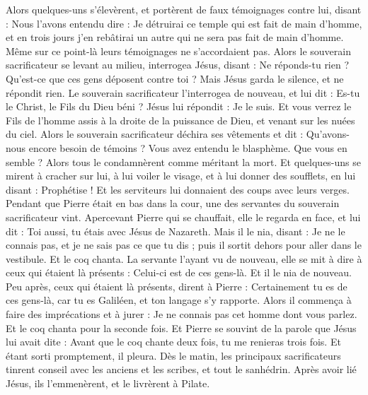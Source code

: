 \begin{multicols}{2}
Alors quelques-uns s'élevèrent, et portèrent de faux témoignages contre lui, disant :
Nous l’avons entendu dire : Je détruirai ce temple qui est fait de main d’homme, et en trois jours j'en rebâtirai un autre qui ne sera pas fait de main d’homme.
Même sur ce point-là leurs témoignages ne s’accordaient pas.
Alors le souverain sacrificateur se levant au milieu, interrogea Jésus, disant : Ne réponds-tu rien ? Qu’est-ce que ces gens déposent contre toi ?
Mais Jésus garda le silence, et ne répondit rien. Le souverain sacrificateur l'interrogea de nouveau, et lui dit : Es-tu le Christ, le Fils du Dieu béni ?
Jésus lui répondit : Je le suis. Et vous verrez le Fils de l'homme assis à la droite de la puissance de Dieu, et venant sur les nuées du ciel.
Alors le souverain sacrificateur déchira ses vêtements et dit : Qu'avons-nous encore besoin de témoins ?
Vous avez entendu le blasphème. Que vous en semble ? Alors tous le condamnèrent comme méritant la mort.
Et quelques-uns se mirent à cracher sur lui, à lui voiler le visage, et à lui donner des soufflets, en lui disant : Prophétise ! Et les serviteurs lui donnaient des coups avec leurs verges.
Pendant que Pierre était en bas dans la cour, une des servantes du souverain sacrificateur vint.
Apercevant Pierre qui se chauffait, elle le regarda en face, et lui dit : Toi aussi, tu étais avec Jésus de Nazareth.
Mais il le nia, disant : Je ne le connais pas, et je ne sais pas ce que tu dis ; puis il sortit dehors pour aller dans le vestibule. Et le coq chanta.
La servante l'ayant vu de nouveau, elle se mit à dire à ceux qui étaient là présents : Celui-ci est de ces gens-là. Et il le nia de nouveau.
Peu après, ceux qui étaient là présents, dirent à Pierre : Certainement tu es de ces gens-là, car tu es Galiléen, et ton langage s'y rapporte.
Alors il commença à faire des imprécations et à jurer : Je ne connais pas cet homme dont vous parlez.
Et le coq chanta pour la seconde fois. Et Pierre se souvint de la parole que Jésus lui avait dite : Avant que le coq chante deux fois, tu me renieras trois fois. Et étant sorti promptement, il pleura.
\VerseOne{}Dès le matin, les principaux sacrificateurs tinrent conseil avec les anciens et les scribes, et tout le sanhédrin. Après avoir lié Jésus, ils l'emmenèrent, et le livrèrent à Pilate.

\end{multicols}
